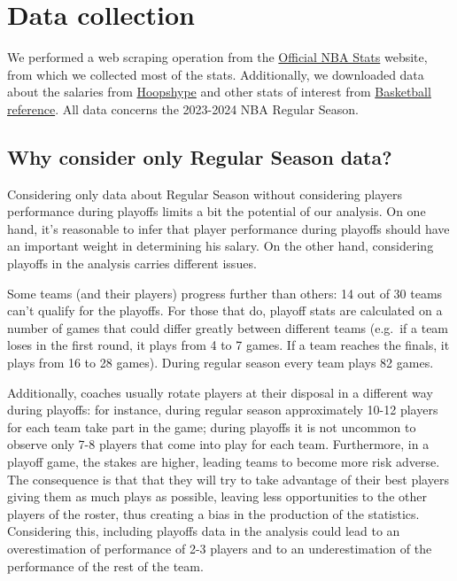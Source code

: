 \documentclass[
]{article}
\begin{document}
\hfill\break

\hypertarget{data-collection}{%
\section{Data collection}\label{data-collection}}

We performed a web scraping operation from the
\href{https://www.nba.com/stats}{Official NBA Stats} website, from which
we collected most of the stats. Additionally, we downloaded data about
the salaries from \href{https://hoopshype.com/}{Hoopshype} and other
stats of interest from
\href{https://www.basketball-reference.com}{Basketball reference}. All
data concerns the 2023-2024 NBA Regular Season.

\hypertarget{why-consider-only-regular-season-data}{%
\subsection{Why consider only Regular Season
data?}\label{why-consider-only-regular-season-data}}

Considering only data about Regular Season without considering players
performance during playoffs limits a bit the potential of our analysis.
On one hand, it's reasonable to infer that player performance during
playoffs should have an important weight in determining his salary. On
the other hand, considering playoffs in the analysis carries different
issues.

Some teams (and their players) progress further than others: 14 out of
30 teams can't qualify for the playoffs. For those that do, playoff
stats are calculated on a number of games that could differ greatly
between different teams (e.g.~if a team loses in the first round, it
plays from 4 to 7 games. If a team reaches the finals, it plays from 16
to 28 games). During regular season every team plays 82 games.

Additionally, coaches usually rotate players at their disposal in a
different way during playoffs: for instance, during regular season
approximately 10-12 players for each team take part in the game; during
playoffs it is not uncommon to observe only 7-8 players that come into
play for each team. Furthermore, in a playoff game, the stakes are
higher, leading teams to become more risk adverse. The consequence is
that that they will try to take advantage of their best players giving
them as much plays as possible, leaving less opportunities to the other
players of the roster, thus creating a bias in the production of the
statistics. Considering this, including playoffs data in the analysis
could lead to an overestimation of performance of 2-3 players and to an
underestimation of the performance of the rest of the team.
\end{document}
